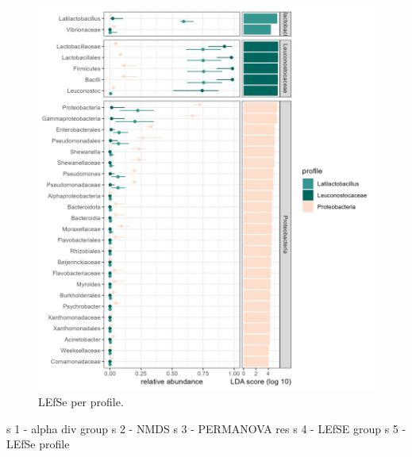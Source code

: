 \documentclass[preprint, 3p,
authoryear]{elsarticle} %
\begin{document}
\begin{figure}

{\centering \includegraphics[width=1\linewidth]{lefsestatplot_profile} 

}

\caption{\label{figSM5} LEfSe per profile.  }\label{fig:figSM5}
\end{figure}

s 1 - alpha div group s 2 - NMDS s 3 - PERMANOVA res s 4 - LEfSE group s
5 - LEfSe profile

\newpage

\renewcommand\refname{References}

\end{document}
